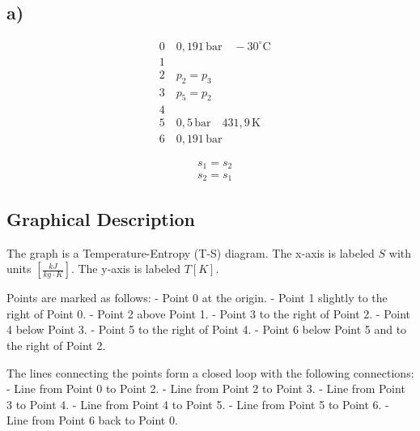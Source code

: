 

\subsection*{a)}

\begin{align*}
&0 \quad 0,191 \, \text{bar} \quad -30^\circ \text{C} \\
&1 \\
&2 \quad p_2 = p_3 \\
&3 \quad p_5 = p_2 \\
&4 \\
&5 \quad 0,5 \, \text{bar} \quad 431,9 \, \text{K} \\
&6 \quad 0,191 \, \text{bar}
\end{align*}

\begin{align*}
&s_1 = s_2 \\
&s_2 = s_1
\end{align*}

\subsection*{Graphical Description}

The graph is a Temperature-Entropy (T-S) diagram. The x-axis is labeled $S$ with units $[\frac{kJ}{kg \cdot K}]$. The y-axis is labeled $T [K]$. 

Points are marked as follows:
- Point 0 at the origin.
- Point 1 slightly to the right of Point 0.
- Point 2 above Point 1.
- Point 3 to the right of Point 2.
- Point 4 below Point 3.
- Point 5 to the right of Point 4.
- Point 6 below Point 5 and to the right of Point 2.

The lines connecting the points form a closed loop with the following connections:
- Line from Point 0 to Point 2.
- Line from Point 2 to Point 3.
- Line from Point 3 to Point 4.
- Line from Point 4 to Point 5.
- Line from Point 5 to Point 6.
- Line from Point 6 back to Point 0.